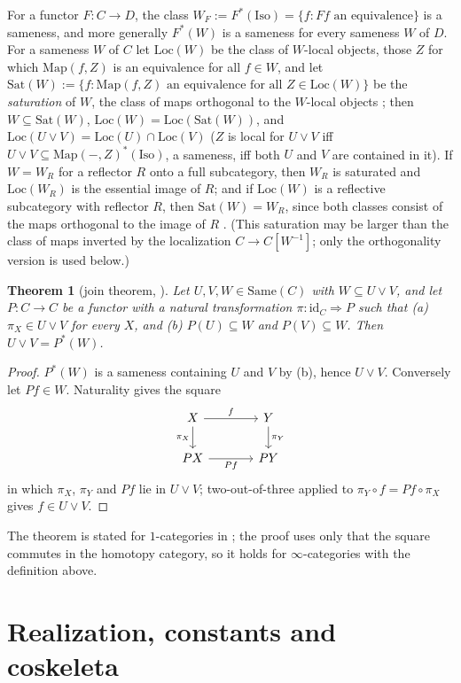 \documentclass[11pt]{amsart}
\newtheorem{thm}{Theorem}[section]
\theoremstyle{definition}
\newcommand{\Same}{\mathrm{Same}}
\newcommand{\Iso}{\mathrm{Iso}}
\newcommand{\Sat}{\mathrm{Sat}}
\newcommand{\Loc}{\mathrm{Loc}}
\newcommand{\Map}{\mathrm{Map}}
\begin{document}
For a functor $F\colon C\to D$, the class $W_F:=F^*(\Iso)=\{f:Ff\text{ an
equivalence}\}$ is a sameness, and more generally $F^*(W)$ is a sameness for
every sameness $W$ of $D$. For a sameness $W$ of $C$ let $\Loc(W)$ be the
class of $W$-local objects, those $Z$ for which $\Map(f,Z)$ is an equivalence
for all $f\in W$, and let $\Sat(W):=\{f:\Map(f,Z)\text{ an equivalence for all }
Z\in\Loc(W)\}$ be the \emph{saturation} of $W$, the class of maps orthogonal
to the $W$-local objects \cite[Def.~2.2]{Postnikov}; then
$W\subseteq\Sat(W)$, $\Loc(W)=\Loc(\Sat(W))$, and $\Loc(U\vee V)=\Loc(U)\cap\Loc(V)$
($Z$ is local for $U\vee V$ iff $U\vee V\subseteq\Map(-,Z)^*(\Iso)$, a
sameness, iff both $U$ and $V$ are contained in it). If $W=W_R$ for a
reflector $R$ onto a full subcategory, then $W_R$ is saturated and $\Loc(W_R)$
is the essential image of $R$; and if $\Loc(W)$ is a reflective subcategory
with reflector $R$, then $\Sat(W)=W_R$, since both classes consist of the maps
orthogonal to the image of $R$ \cite[Lemma~2.3]{Postnikov}. (This saturation
may be larger than the class of maps inverted by the localization
$C\to C[W^{-1}]$; only the orthogonality version is used below.)

\begin{thm}[join theorem, {\cite[Thm.~4.1]{Postnikov}}]\label{thm:generaljoin}
Let $U,V,W\in\Same(C)$ with $W\subseteq U\vee V$, and let $P\colon C\to C$ be
a functor with a natural transformation $\pi\colon\mathrm{id}_C\Rightarrow P$
such that (a) $\pi_X\in U\vee V$ for every $X$, and (b) $P(U)\subseteq W$ and
$P(V)\subseteq W$. Then $U\vee V=P^*(W)$.
\end{thm}
\begin{proof}
$P^*(W)$ is a sameness containing $U$ and $V$ by (b), hence $U\vee V$.
Conversely let $Pf\in W$. Naturality gives the square
\[
\begin{tikzcd}[column sep=large]
X\arrow[r,"f"]\arrow[d,"\pi_X"'] & Y\arrow[d,"\pi_Y"]\\
PX\arrow[r,"Pf"'] & PY
\end{tikzcd}
\]
in which $\pi_X$, $\pi_Y$ and $Pf$ lie in $U\vee V$; two-out-of-three applied
to $\pi_Y\circ f=Pf\circ\pi_X$ gives $f\in U\vee V$.
\end{proof}

The theorem is stated for $1$-categories in \cite{Postnikov}; the proof uses
only that the square commutes in the homotopy category, so it holds for
$\infty$-categories with the definition above.

\section{Realization, constants and coskeleta}\label{sec:simp}
\end{document}
